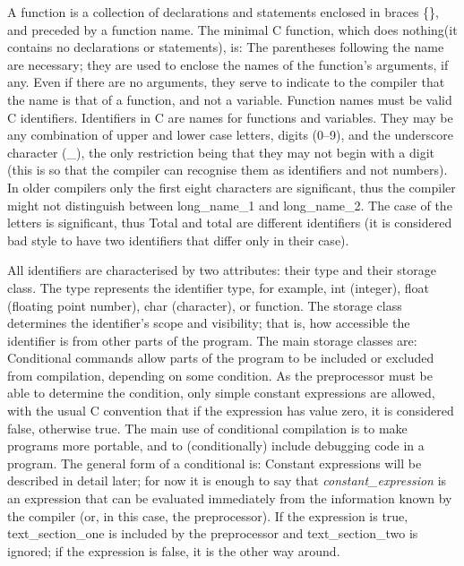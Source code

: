 A function  is a  collection of  {\kc declarations\/} and  {\kc
statements\/} enclosed in braces {\cd \{\}}, and preceded by a {\kc
function name}. The minimal C function, which does
nothing(it contains no declarations or statements), is:
 The parentheses  following the  name are  necessary;  they  are  used
to enclose the  names of  the function's  arguments, if any. Even if
there are no arguments, they  serve to  indicate to the compiler that
the name is that of a function, and not a variable. Function names
must be valid C {\kc identifiers\/}.
     Identifiers in  C are  names for functions and variables. They
may be any combination  of  upper  and  lower  case letters, 
digits  (0--9),  and  the underscore character (\_), the only
restriction being that they may not begin with a  digit (this  is so
that the compiler can recognise them as identifiers and not numbers).
In older compilers only the first eight characters are significant, thus the
compiler  might not  distinguish between  {\cd long\_name\_1} and  
{\cd long\_name\_2}. The case of the letters is significant,  thus 
{\cd Total}  and  {\cd total}  are  different identifiers (it  is
considered  bad style  to have two identifiers that differ only in
their case).

     All identifiers are characterised by two attributes: their {\kc
type\/} and their {\kc storage class\/}.  The  type  represents the 
identifier type,  for  example,  {\cd int} (integer), {\cd float} 
(floating point  number), {\cd char} (character), or function. The
storage class  determines the  identifier's {\kc scope\/}  and {\kc
visibility\/}; that is, how accessible the identifier is from other
parts of the program. The main storage classes are:
     Conditional commands  allow parts  of  the  program  to  be 
included  or excluded from  compilation, depending  on some 
condition. As the preprocessor must be  able to determine the
condition, only simple constant expressions are allowed, with the
usual C convention that if the expression has value zero, it is
considered false, otherwise true. The main use of conditional
compilation is to make programs more portable, and to (conditionally)
include debugging code in a program.  The general form of a
conditional is:
Constant expressions will be described in detail later; for now it is
enough to say that {\em constant\_expression\/} is an expression that can be
evaluated immediately from  the   information  known   by  the 
compiler  (or,  in  this  case,  the preprocessor). If  the
expression  is true,  {\ms text\_section\_one\/} is included by
the preprocessor  and {\ms text\_section\_two\/}  is ignored; if
the  expression  is false, it is the other way around.

